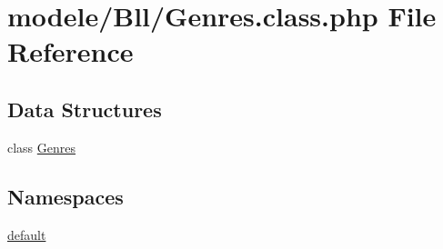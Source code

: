 \hypertarget{_genres_8class_8php}{}\section{modele/\+Bll/\+Genres.class.\+php File Reference}
\label{_genres_8class_8php}
\subsection*{Data Structures}
\begin{DoxyCompactItemize}
\item 
class \hyperlink{class_genres}{Genres}
\end{DoxyCompactItemize}
\subsection*{Namespaces}
\begin{DoxyCompactItemize}
\item 
 \hyperlink{namespacedefault}{default}
\end{DoxyCompactItemize}
